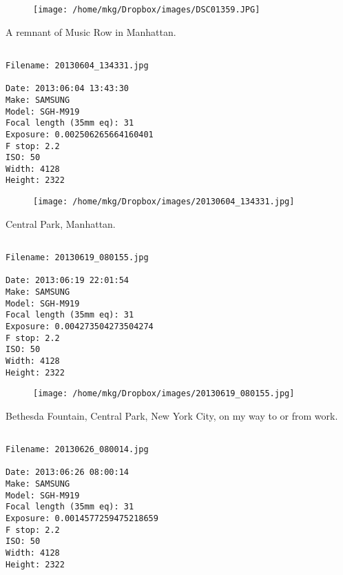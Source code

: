 \begin{figure}
\texttt{[image: /home/mkg/Dropbox/images/DSC01359.JPG]}
\end{figure}
    
\clearpage
\onecolumn
\noindent A remnant of Music Row in Manhattan.
\noindent
\begin{lstlisting}

Filename: 20130604_134331.jpg

Date: 2013:06:04 13:43:30
Make: SAMSUNG
Model: SGH-M919
Focal length (35mm eq): 31
Exposure: 0.002506265664160401
F stop: 2.2
ISO: 50
Width: 4128
Height: 2322
\end{lstlisting}
\clearpage

\begin{figure}
\texttt{[image: /home/mkg/Dropbox/images/20130604\_134331.jpg]}
\end{figure}
    
\clearpage
\onecolumn
\noindent Central Park, Manhattan.
\noindent
\begin{lstlisting}

Filename: 20130619_080155.jpg

Date: 2013:06:19 22:01:54
Make: SAMSUNG
Model: SGH-M919
Focal length (35mm eq): 31
Exposure: 0.004273504273504274
F stop: 2.2
ISO: 50
Width: 4128
Height: 2322
\end{lstlisting}
\clearpage

\begin{figure}
\texttt{[image: /home/mkg/Dropbox/images/20130619\_080155.jpg]}
\end{figure}
    
\clearpage
\onecolumn
\noindent Bethesda Fountain, Central Park, New York City, on my way to or from work.
\noindent
\begin{lstlisting}

Filename: 20130626_080014.jpg

Date: 2013:06:26 08:00:14
Make: SAMSUNG
Model: SGH-M919
Focal length (35mm eq): 31
Exposure: 0.0014577259475218659
F stop: 2.2
ISO: 50
Width: 4128
Height: 2322
\end{lstlisting}
\clearpage


